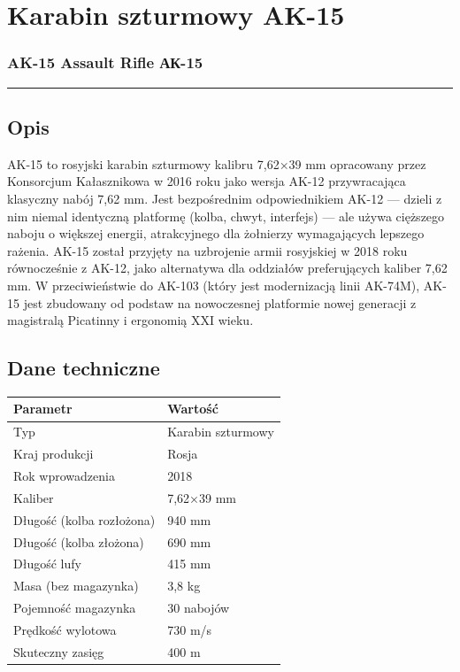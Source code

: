 \documentclass[12pt,openany,oneside]{book}
\begin{document}
\chapter{Karabin szturmowy AK-15}\label{karabin-szturmowy-ak-15}

\subsection{AK-15 Assault Rifle \textbar{}
АК-15}\label{ak-15-assault-rifle-ux430ux43a-15}

\begin{center}\rule{0.5\linewidth}{0.5pt}\end{center}

\section{Opis}\label{opis-49}

AK-15 to rosyjski karabin szturmowy kalibru 7,62×39 mm opracowany przez
Konsorcjum Kałasznikowa w 2016 roku jako wersja AK-12 przywracająca
klasyczny nabój 7,62 mm. Jest bezpośrednim odpowiednikiem AK-12 ---
dzieli z nim niemal identyczną platformę (kolba, chwyt, interfejs) ---
ale używa cięższego naboju o większej energii, atrakcyjnego dla
żołnierzy wymagających lepszego rażenia. AK-15 został przyjęty na
uzbrojenie armii rosyjskiej w 2018 roku równocześnie z AK-12, jako
alternatywa dla oddziałów preferujących kaliber 7,62 mm. W
przeciwieństwie do AK-103 (który jest modernizacją linii AK-74M), AK-15
jest zbudowany od podstaw na nowoczesnej platformie nowej generacji z
magistralą Picatinny i ergonomią XXI wieku.

\section{Dane techniczne}\label{dane-techniczne-49}

\begin{longtable}[]{@{}ll@{}}
\toprule\noalign{}
Parametr & Wartość \\
\midrule\noalign{}
\endhead
\bottomrule\noalign{}
\endlastfoot
Typ & Karabin szturmowy \\
Kraj produkcji & Rosja \\
Rok wprowadzenia & 2018 \\
Kaliber & 7,62×39 mm \\
Długość (kolba rozłożona) & 940 mm \\
Długość (kolba złożona) & 690 mm \\
Długość lufy & 415 mm \\
Masa (bez magazynka) & 3,8 kg \\
Pojemność magazynka & 30 nabojów \\
Prędkość wylotowa & 730 m/s \\
Skuteczny zasięg & 400 m \\
\end{longtable}
\end{document}
